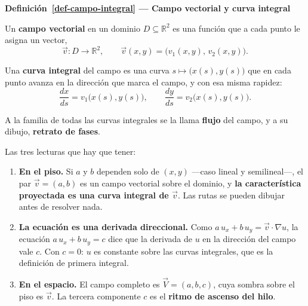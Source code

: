 \documentclass[
  spanish,
  a4paper,
]{scrbook}
\providecommand{\tightlist}{%
  \setlength{\itemsep}{0pt}\setlength{\parskip}{0pt}}
\theoremstyle{definition}
\theoremstyle{plain}
\theoremstyle{definition}
\theoremstyle{plain}
\theoremstyle{definition}
\theoremstyle{remark}
\begin{document}
\begin{tcolorbox}[enhanced jigsaw, arc=.35mm, bottomrule=.15mm, breakable, colback=white, colframe=quarto-callout-note-color-frame, left=2mm, leftrule=.75mm, opacityback=0, rightrule=.15mm, toprule=.15mm]
\begin{minipage}[t]{5.5mm}
\textcolor{quarto-callout-note-color}{\faInfo}
\end{minipage}%
\begin{minipage}[t]{\textwidth - 5.5mm}

\vspace{-3mm}\textbf{Definición~\ref{def-campo-integral} --- Campo vectorial y curva integral}\vspace{3mm}

Un \textbf{campo vectorial} en un dominio \(D \subseteq \mathbb{R}^2\)
es una función que a cada punto le asigna un vector, \[
\vec v : D \to \mathbb{R}^2, \qquad \vec v(x,y) = \big(v_1(x,y),\, v_2(x,y)\big) .
\]

Una \textbf{curva integral} del campo es una curva
\(s \mapsto \big(x(s), y(s)\big)\) que en cada punto avanza en la
dirección que marca el campo, y con esa misma rapidez: \[
\frac{dx}{ds} = v_1\big(x(s), y(s)\big), \qquad
\frac{dy}{ds} = v_2\big(x(s), y(s)\big) .
\]

A la familia de todas las curvas integrales se la llama \textbf{flujo}
del campo, y a su dibujo, \textbf{retrato de fases}.

\end{minipage}%
\end{tcolorbox}

Las tres lecturas que hay que tener:

\begin{enumerate}
\def\labelenumi{\arabic{enumi}.}
\tightlist
\item
  \textbf{En el piso.} Si \(a\) y \(b\) dependen solo de \((x,y)\)
  ---caso lineal y semilineal---, el par \(\vec v = (a,b)\) es un campo
  vectorial sobre el dominio, y \textbf{la característica proyectada es
  una curva integral de \(\vec v\)}. Las rutas se pueden dibujar antes
  de resolver nada.
\item
  \textbf{La ecuación es una derivada direccional.} Como
  \(a\,u_x + b\,u_y = \vec v\cdot\nabla u\), la ecuación
  \(a\,u_x + b\,u_y = c\) dice que la derivada de \(u\) en la dirección
  del campo vale \(c\). Con \(c=0\): \(u\) es constante sobre las curvas
  integrales, que es la definición de primera integral.
\item
  \textbf{En el espacio.} El campo completo es \(\vec V = (a,b,c)\),
  cuya sombra sobre el piso es \(\vec v\). La tercera componente \(c\)
  es el \textbf{ritmo de ascenso del hilo}.
\end{enumerate}
\end{document}
